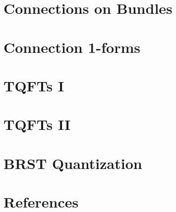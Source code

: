 \documentclass[11pt]{article}
\begin{document}
\newpage
\section{Connections on Bundles}
\vskip 0.5cm


\newpage
\section{Connection 1-forms}
\vskip 0.5cm


\newpage
\section{TQFTs I}
\vskip 0.5cm


\newpage
\section{TQFTs II}
\vskip 0.5cm


\newpage
\section{BRST Quantization}
\vskip 0.5cm


\newpage
\section{References}
\vskip 0.5cm
\end{document}
